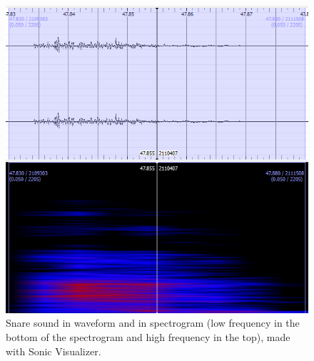 \begin{figure}[H]
	\begin{center}
		\includegraphics[scale = 0.5]{fig/Snare-close-up-with-spectrogram.png}
		\caption{Snare sound in waveform and in spectrogram (low frequency in the bottom of the spectrogram and high frequency in the top), made with Sonic Visualizer.}
		\label{snareClose}
	\end{center}
\end{figure}

